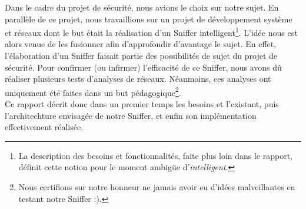 Dans le cadre du projet de sécurité, nous avions le choix sur notre sujet. En parallèle de ce projet, nous travaillions sur un projet de développement système et réseaux dont le but était la réalisation d'un Sniffer intelligent\footnote{La description des besoins et fonctionnalités, faite  plus loin dans le rapport, définit cette notion pour le moment ambigüe d'\emph{intelligent}.}. L'idée nous est alors venue de les fusionner afin d'approfondir d'avantage le sujet. En effet, l'élaboration d'un Sniffer faisait partie des possibilités de sujet du projet de sécurité. Pour confirmer (ou infirmer) l'efficacité de ce Sniffer, nous avons dû réaliser plusieurs tests d'analyses de réseaux. Néanmoins, ces analyses ont uniquement été faites dans un but pédagogique\footnote{Nous certifions sur notre honneur ne jamais avoir eu d'idées malveillantes en testant notre Sniffer :).}.\\

 Ce rapport décrit donc dans un premier temps les besoins et l'existant, puis l'architechture envisagée de notre Sniffer, et enfin son implémentation effectivement réalisée.
